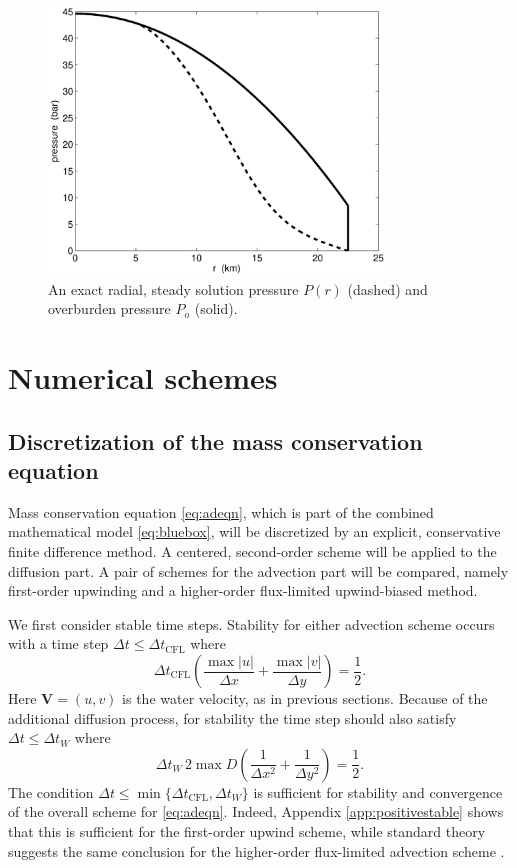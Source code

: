 \documentclass[11pt,final]{amsart}
\newcommand\bV{\mathbf{V}}
\begin{document}
\begin{figure}[ht]
\includegraphics[width=3.5in,keepaspectratio=true]{exact-P-plot}
\caption{An exact radial, steady solution pressure $P(r)$ (dashed) and overburden pressure $P_o$ (solid).}
\label{fig:Pexact}
\end{figure}


\section{Numerical schemes}  \label{sec:num}

\subsection*{Discretization of the mass conservation equation}  Mass conservation equation \eqref{eq:adeqn}, which is part of the combined mathematical model \eqref{eq:bluebox}, will be discretized by an explicit, conservative finite difference method.   A centered, second-order scheme will be applied to the diffusion part.  A pair of schemes for the advection part will be compared, namely first-order upwinding and a higher-order flux-limited upwind-biased method.

We first consider stable time steps.  Stability for either advection scheme occurs with a time step $\Delta t \le \Delta t_{\text{CFL}}$ where
\begin{equation}
\Delta t_{\text{CFL}} \left(\frac{\max |u|}{\Delta x} + \frac{\max |v|}{\Delta y}\right) = \frac{1}{2}. \label{eq:dtCFL}
\end{equation}
Here $\bV=(u,v)$ is the water velocity, as in previous sections.  Because of the additional diffusion process, for stability the time step should also satisfy $\Delta t \le \Delta t_{W}$  where \citep{MortonMayers}
\begin{equation}
\Delta t_W\, 2 \max D \left(\frac{1}{\Delta x^2} + \frac{1}{\Delta y^2}\right) = \frac{1}{2}. \label{eq:dtDIFFW}
\end{equation}
The condition $\Delta t \le \min\{\Delta t_{\text{CFL}}, \Delta t_W\}$ is sufficient for stability and convergence of the overall scheme for \eqref{eq:adeqn}.  Indeed, Appendix \ref{app:positivestable} shows that this is sufficient for the first-order upwind scheme, while standard theory suggests the same conclusion for the higher-order flux-limited advection scheme \citep{HundsdorferVerwer2010}.
\end{document}
